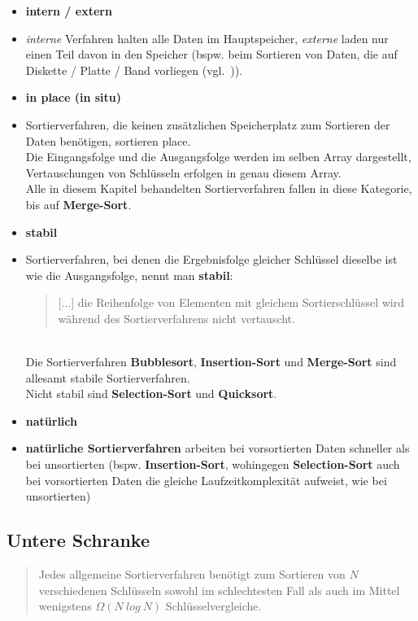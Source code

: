 \begin{itemize}
    \item \textbf{intern / extern}
    \item[] \textit{interne} Verfahren halten alle Daten im Hauptspeicher, \textit{externe} laden nur einen Teil davon in den Speicher (bspw. beim Sortieren von Daten, die auf Diskette / Platte / Band vorliegen (vgl.~\cite[80]{OW17b})).
    \item \textbf{in place (in situ)}
    \item [] Sortierverfahren, die keinen zusätzlichen Speicherplatz zum Sortieren der Daten benötigen, sortieren \textbfin place.\\
    Die Eingangsfolge und die Ausgangsfolge werden im selben Array dargestellt, Vertauschungen von Schlüsseln erfolgen in genau diesem Array.\\
    Alle in diesem Kapitel behandelten Sortierverfahren fallen in diese Kategorie, bis auf \textbf{Merge-Sort}.
    \item \textbf{stabil}
    \item[] Sortierverfahren, bei denen die Ergebnisfolge gleicher Schlüssel dieselbe ist wie die Ausgangsfolge, nennt man \textbf{stabil}:\blockquote[{\cite[164]{OW17b}}]{
        [...] die Reihenfolge von Elementen mit gleichem Sortierschlüssel wird während des Sortierverfahrens nicht vertauscht.
    }.\\
    Die Sortierverfahren \textbf{Bubblesort}, \textbf{Insertion-Sort} und \textbf{Merge-Sort} sind allesamt stabile Sortierverfahren.\\
    Nicht stabil sind \textbf{Selection-Sort} und \textbf{Quicksort}.
    \item \textbf{natürlich}
    \item[] \textbf{natürliche Sortierverfahren} arbeiten bei vorsortierten Daten schneller als bei unsortierten (bspw. \textbf{Insertion-Sort}, wohingegen \textbf{Selection-Sort} auch bei vorsortierten Daten die gleiche Laufzeitkomplexität aufweist, wie bei unsortierten)
\end{itemize}


\subsection{Untere Schranke}

\blockquote[{\cite[154, Satz 2.4]{OW17b}}]{
    Jedes allgemeine Sortierverfahren benötigt zum Sortieren von $N$ verschiedenen Schlüsseln sowohl im schlechtesten Fall als auch im Mittel wenigstens $\Omega(N\ log\ N)$ Schlüsselvergleiche.
}.


